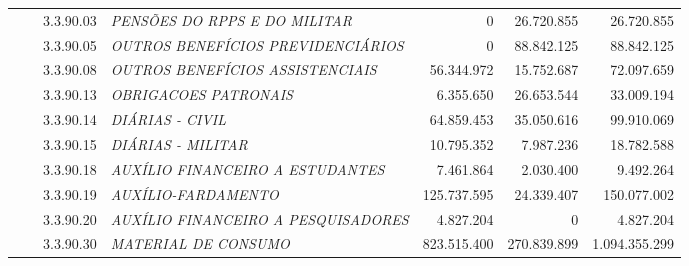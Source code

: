 \documentclass{article}
\begin{document}
\begin{longtable}[c]{m{0.1cm}m{0.1cm}m{0.8cm}|m{8cm}|m{2cm}|m{2cm}|m{2cm}}
\multicolumn{1}{l}{} & \multicolumn{1}{l}{} & \multicolumn{1}{l|}{3.3.90.03} & \multicolumn{1}{L{8cm}|}{\textit{PENSÕES DO RPPS E DO MILITAR}} & \multicolumn{1}{r|}{             0} & \multicolumn{1}{r|}{26.720.855} &  \multicolumn{1}{r}{26.720.855}\\
\multicolumn{1}{l}{} & \multicolumn{1}{l}{} & \multicolumn{1}{l|}{3.3.90.05} & \multicolumn{1}{L{8cm}|}{\textit{OUTROS BENEFÍCIOS PREVIDENCIÁRIOS}} & \multicolumn{1}{r|}{             0} & \multicolumn{1}{r|}{88.842.125} &  \multicolumn{1}{r}{88.842.125}\\
\multicolumn{1}{l}{} & \multicolumn{1}{l}{} & \multicolumn{1}{l|}{3.3.90.08} & \multicolumn{1}{L{8cm}|}{\textit{OUTROS BENEFÍCIOS ASSISTENCIAIS}} & \multicolumn{1}{r|}{56.344.972} & \multicolumn{1}{r|}{15.752.687} &  \multicolumn{1}{r}{72.097.659}\\
\multicolumn{1}{l}{} & \multicolumn{1}{l}{} & \multicolumn{1}{l|}{3.3.90.13} & \multicolumn{1}{L{8cm}|}{\textit{OBRIGACOES PATRONAIS}} & \multicolumn{1}{r|}{6.355.650} & \multicolumn{1}{r|}{26.653.544} &  \multicolumn{1}{r}{33.009.194}\\
\multicolumn{1}{l}{} & \multicolumn{1}{l}{} & \multicolumn{1}{l|}{3.3.90.14} & \multicolumn{1}{L{8cm}|}{\textit{DIÁRIAS - CIVIL}} & \multicolumn{1}{r|}{64.859.453} & \multicolumn{1}{r|}{35.050.616} &  \multicolumn{1}{r}{99.910.069}\\
\multicolumn{1}{l}{} & \multicolumn{1}{l}{} & \multicolumn{1}{l|}{3.3.90.15} & \multicolumn{1}{L{8cm}|}{\textit{DIÁRIAS - MILITAR}} & \multicolumn{1}{r|}{10.795.352} & \multicolumn{1}{r|}{7.987.236} &  \multicolumn{1}{r}{18.782.588}\\
\multicolumn{1}{l}{} & \multicolumn{1}{l}{} & \multicolumn{1}{l|}{3.3.90.18} & \multicolumn{1}{L{8cm}|}{\textit{AUXÍLIO FINANCEIRO A ESTUDANTES}} & \multicolumn{1}{r|}{7.461.864} & \multicolumn{1}{r|}{2.030.400} &  \multicolumn{1}{r}{9.492.264}\\
\multicolumn{1}{l}{} & \multicolumn{1}{l}{} & \multicolumn{1}{l|}{3.3.90.19} & \multicolumn{1}{L{8cm}|}{\textit{AUXÍLIO-FARDAMENTO}} & \multicolumn{1}{r|}{125.737.595} & \multicolumn{1}{r|}{24.339.407} &  \multicolumn{1}{r}{150.077.002}\\
\multicolumn{1}{l}{} & \multicolumn{1}{l}{} & \multicolumn{1}{l|}{3.3.90.20} & \multicolumn{1}{L{8cm}|}{\textit{AUXÍLIO FINANCEIRO A PESQUISADORES}} & \multicolumn{1}{r|}{4.827.204} & \multicolumn{1}{r|}{             0} &  \multicolumn{1}{r}{4.827.204}\\
\multicolumn{1}{l}{} & \multicolumn{1}{l}{} & \multicolumn{1}{l|}{3.3.90.30} & \multicolumn{1}{L{8cm}|}{\textit{MATERIAL DE CONSUMO}} & \multicolumn{1}{r|}{823.515.400} & \multicolumn{1}{r|}{270.839.899} &  \multicolumn{1}{r}{1.094.355.299}\\

\end{longtable}
\end{document}
